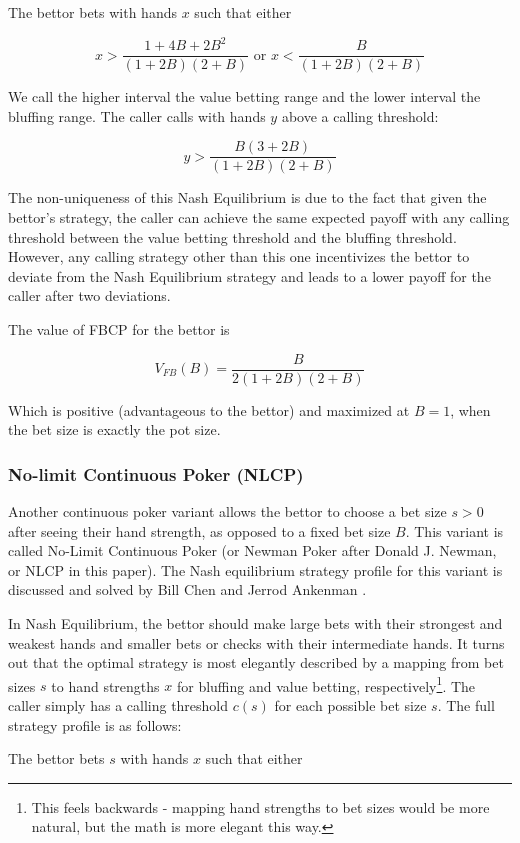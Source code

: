 \documentclass[../../main/main.tex]{subfiles}
\begin{document}
The bettor bets with hands $x$ such that either 

$$x > \frac{1 + 4B + 2B^2}{(1+2B)(2+B)} \text{ or } x < \frac{B}{(1+2B)(2+B)}$$

We call the higher interval the value betting range and the lower interval the bluffing range. The caller calls with hands $y$ above a calling threshold:

$$ y > \frac{B(3 +2B)}{(1+2B)(2+B)} $$

The non-uniqueness of this Nash Equilibrium is due to the fact that given the bettor's strategy, the caller can achieve the same expected payoff with any calling threshold between the value betting threshold and the bluffing threshold. However, any calling strategy other than this one incentivizes the bettor to deviate from the Nash Equilibrium strategy and leads to a lower payoff for the caller after two deviations. 

The value of FBCP for the bettor is 

$$ V_{FB}(B) = \frac{B}{2(1+2B)(2+B)} $$

Which is positive (advantageous to the bettor) and maximized at $B = 1$, when the bet size is exactly the pot size. 

\subsubsection{No-limit Continuous Poker (NLCP)}
Another continuous poker variant allows the bettor to choose a bet size $s > 0$ after seeing their hand strength, as opposed to a fixed bet size $B$. This variant is called No-Limit Continuous Poker (or Newman Poker after Donald J. Newman, or NLCP in this paper). The Nash equilibrium strategy profile for this variant is discussed and solved by Bill Chen and Jerrod Ankenman \cite[p. 154]{chen2006mathematics}.

In Nash Equilibrium, the bettor should make large bets with their strongest and weakest hands and smaller bets or checks with their intermediate hands. It turns out that the optimal strategy is most elegantly described by a mapping from bet sizes $s$ to hand strengths $x$ for bluffing and value betting, respectively\footnote{This feels backwards - mapping hand strengths to bet sizes would be more natural, but the math is more elegant this way.}. The caller simply has a calling threshold $c(s)$ for each possible bet size $s$. The full strategy profile is as follows:

The bettor bets $s$ with hands $x$ such that either
\end{document}
